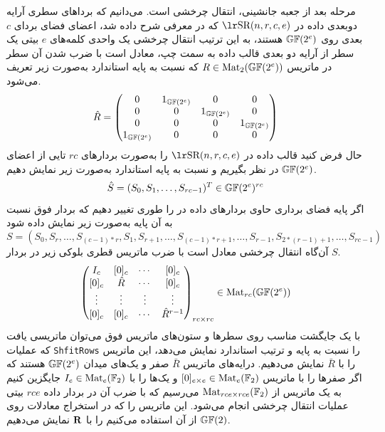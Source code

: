 مرحله بعد از جعبه جانشینی، انتقال چرخشی است.  می‌دانیم که برداهای سطری آرایه دوبعدی داده در 
$\text{\en{SR}}(n,r,c,e)$
که در معرفی
شرح داده شد، اعضای فضای بردای 
$c$
بعدی روی 
$\mathbb{GF}(2^{e})$
هستند، به این ترتیب انتقال چرخشی یک‌ واحدی کلمه‌های 
$e$
بیتی یک سطر از آرایه دو بعدی قالب داده به سمت چپ، معادل است با ضرب شدن آن سطر در  ماتریس 
$R\in\operatorname{\mathrm{Mat}}_{2}(\mathbb{GF}(2^{e}))$
که نسبت به پایه استاندارد به‌صورت زیر تعریف می‌شود. 
$$
\hat{R} = \begin{pmatrix}
0&1_{\mathbb{GF}(2^{e})}&0&0\\
0&0&1_{\mathbb{GF}(2^{e})}&0\\
0&0&0&1_{\mathbb{GF}(2^{e})}\\
1_{\mathbb{GF}(2^{e})}&0&0&0\\
\end{pmatrix}
$$
حال فرض کنید قالب داده در 
$\text{\en{SR}}(n,r,c,e)$
را به‌صورت بردارهای 
$rc$
تایی از اعضای 
$\mathbb{GF}(2^{e})$
در نظر بگیریم و نسبت به پایه استاندارد  به‌صورت زیر نمایش دهیم. 
$$\hat{S} = (S_{0},S_{1},\ldots,S_{rc-1})^{T}\in\mathbb{GF}(2^{e})^{rc}$$
اگر پایه فضای برداری حاوی بردارهای داده در 
را طوری تغییر دهیم که بردار فوق نسبت به آن‌ پایه به‌صورت زیر نمایش داده شود
$$S = (S_{0},S_{r},\ldots,S_{(c-1)*r},S_{1},S_{r+1},\ldots,S_{(c-1)*r +1},\ldots,S_{r-1},S_{2*(r-1) + 1},\ldots,S_{rc -1})$$
آن‌گاه انتقال چرخشی معادل است با ضرب ماتریس قطری بلوکی زیر در بردار 
$S$. 
$$
\begin{pmatrix}
	I_{c}&[0]_{c}&\cdots&[0]_{c}\\
	[0]_{c}&\hat{R}&\cdots&[0]_{c}\\
	\vdots&\vdots&\vdots&\vdots\\
	[0]_{c}&[0]_{c}&\cdots& \hat{R}^{r-1}\\
\end{pmatrix}_{rc\times rc}\in\operatorname{\mathrm{Mat}}_{rc}(\mathbb{GF}(2^{e}))
$$
با یک جایگشت مناسب روی سطرها و ستون‌های ماتریس فوق می‌توان ماتریسی یافت که عملیات 
\texttt{ShfitRows}
را نسبت به پایه و ترتیب استاندارد نمایش می‌دهد، این ماتریس را با 
$\bar{R}$
نمایش می‌دهیم. درایه‌های ماتریس 
$\bar{R}$
صفر و یک‌های میدان 
$\mathbb{GF}(2^{e})$
هستند که اگر  صفرها را با ماتریس 
$[0]_{e\times e}\in\operatorname{\mathrm{Mat}}_{e}(\mathbb{F}_{2})$
و یک‌ها را با 
$I_{e}\in\operatorname{\mathrm{Mat}}_{e}(\mathbb{F}_{2})$
جایگزین کنیم به یک ماتریس از 
$\operatorname{\mathrm{Mat}}_{rce\times rce}(\mathbb{F}_{2})$
می‌رسیم که با ضرب آن در بردار داده 
$rce$
بیتی عملیات انتقال چرخشی انجام می‌شود. این ماتریس را که در استخراج معادلات روی 
$\mathbb{GF}(2)$
از آن استفاده می‌کنیم را با 
$\bf{R}$
نمایش می‌دهیم. 

